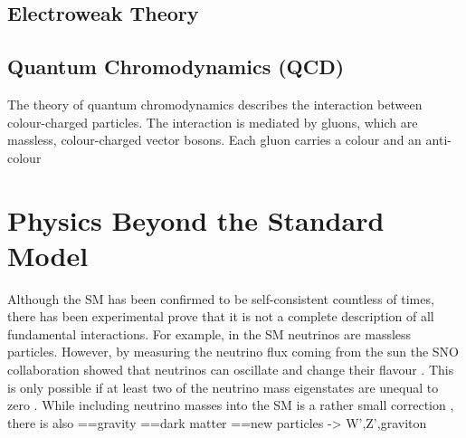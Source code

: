 \subsection{Electroweak Theory}

\subsection{Quantum Chromodynamics (QCD)}
The theory of quantum chromodynamics describes the interaction between colour-charged particles. The interaction is mediated by gluons, which are massless, colour-charged vector bosons. Each gluon carries a colour and an anti-colour
\section{Physics Beyond the Standard Model}
Although the SM has been confirmed to be self-consistent countless of times, there has been experimental prove that it is not a complete description of all fundamental interactions. For example, in the SM neutrinos are massless particles. However, by measuring the neutrino flux coming from the sun the SNO collaboration showed that neutrinos can oscillate and change their flavour \cite{SNO}. This is only possible if at least two of the neutrino mass eigenstates are unequal to zero \cite{}. While including neutrino masses into the SM is a rather small correction \cite{numassesSMP}, there is also 
==gravity
==dark matter
==new particles -> W',Z',graviton
